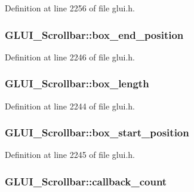 Definition at line 2256 of file glui.\+h.

\hypertarget{class_g_l_u_i___scrollbar_a75a697d414c0efe18070ca93a0961091}{
\subsubsection[{box\+\_\+end\+\_\+position}]{ G\+L\+U\+I\+\_\+\+Scrollbar\+::box\+\_\+end\+\_\+position}}\label{class_g_l_u_i___scrollbar_a75a697d414c0efe18070ca93a0961091}


Definition at line 2246 of file glui.\+h.

\hypertarget{class_g_l_u_i___scrollbar_a9970e334cae062771414f55c0b846270}{
\subsubsection[{box\+\_\+length}]{ G\+L\+U\+I\+\_\+\+Scrollbar\+::box\+\_\+length}}\label{class_g_l_u_i___scrollbar_a9970e334cae062771414f55c0b846270}


Definition at line 2244 of file glui.\+h.

\hypertarget{class_g_l_u_i___scrollbar_a6b7284df7537af88d8acdd643f807210}{
\subsubsection[{box\+\_\+start\+\_\+position}]{ G\+L\+U\+I\+\_\+\+Scrollbar\+::box\+\_\+start\+\_\+position}}\label{class_g_l_u_i___scrollbar_a6b7284df7537af88d8acdd643f807210}


Definition at line 2245 of file glui.\+h.

\hypertarget{class_g_l_u_i___scrollbar_ab4a3269a65ba4b64eb06e0eb6c63b7e0}{
\subsubsection[{callback\+\_\+count}]{ G\+L\+U\+I\+\_\+\+Scrollbar\+::callback\+\_\+count}}\label{class_g_l_u_i___scrollbar_ab4a3269a65ba4b64eb06e0eb6c63b7e0}



